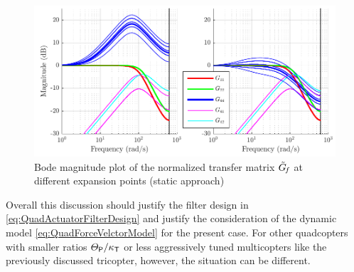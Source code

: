 \begin{figure}[ht]
 \centering
 \includegraphics{graphics/QuadActuatorDynamics/BodeQuadActorDynTraditional.pdf}
 \caption{Bode magnitude plot of the normalized transfer matrix $\tilde{G}_{\hspace{-0.3ex}f}$ at different expansion points (static approach)}
 \label{fig:BodeQuadActorDynTraditional}
\end{figure}

Overall this discussion should justify the filter design in \eqref{eq:QuadActuatorFilterDesign} and justify the consideration of the dynamic model \eqref{eq:QuadForceVelctorModel} for the present case.
For other quadcopters with smaller ratios $\varTheta_\mathsf{P} / \kappa_{\mathsf{T}}$ or less aggressively tuned multicopters like the previously discussed tricopter, however, the situation can be different.
